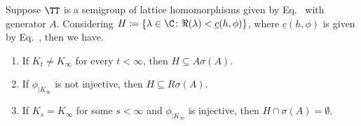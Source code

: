 \begin{theorem}\label{thm:b3-4.4}
	Suppose $\TT$ is a semigroup of lattice homomorphisms given by Eq.~ with generator $A$.
	Considering $H \coloneq \{\lambda \in \C \colon \Re(\lambda) < \underline{c}(h,\phi)\}$, where $\underline{c}(h,\phi)$ is given by Eq.~, then we have.
	\begin{enumerate}[\upshape (i)]
		\item 
		If\/ $K_{t} \neq K_{\infty}$ for every $t < \infty$, then $H \subseteq A\sigma(A)$.
	
		\item 
		If\/ $\phi_{|K_{\infty}}$ is not injective, then $H \subseteq R\sigma(A)$.
	
		\item 
		If\/ $K_{s} = K_{\infty}$ for some $s < \infty$ and $\phi_{|K_{\infty}}$ is injective, then $H\cap\sigma(A) = \emptyset$.
	\end{enumerate} 
\end{theorem}
